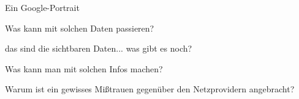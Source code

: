 \begin{frame}{Ein Google-Portrait}
\end{frame}

\begin{frame}{Was kann mit solchen Daten passieren?}
\end{frame}

\begin{frame}{das sind die sichtbaren Daten... was gibt es noch?}
\end{frame}

\begin{frame}{Was kann man mit solchen Infos machen?}
\end{frame}

\begin{frame}{Warum ist ein gewisses Mißtrauen gegenüber den Netzprovidern angebracht?}
\end{frame}

